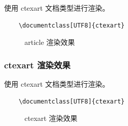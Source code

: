 \documentclass[UTF8,AutoFakeBold]{ctexart}
\numberwithin{figure}{section}
\numberwithin{table}{section}
\begin{document}
使用 ctexart 文档类型进行渲染。
\begin{lstlisting}
    \documentclass[UTF8]{ctexart}
\end{lstlisting}
\begin{center}
\begin{figure}[H]
    \centering
    \setlength{\fboxrule}{0.1pt}
    \setlength{\fboxsep}{0cm}
    \caption{article 渲染效果}
    \label{Fig:article_render}
\end{figure}
\end{center}


\subsubsection{ctexart 渲染效果}

使用 ctexart 文档类型进行渲染。
\begin{lstlisting}
    \documentclass[UTF8]{ctexart}
\end{lstlisting}

\begin{center}
\begin{figure}[H]
    \centering
    \setlength{\fboxrule}{0.1pt}
    \setlength{\fboxsep}{0cm}
    \caption{ctexart 渲染效果}
    \label{Fig:ctexart_render}
\end{figure}
\end{center}
\end{document}
